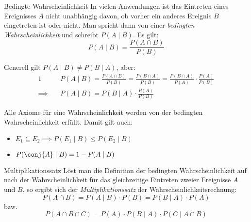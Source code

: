 \begin{defi}{Bedingte Wahrscheinlichkeit}
    In vielen Anwendungen ist das Eintreten eines Ereignisses $A$ nicht unabhängig davon, ob vorher ein anderes Ereignis $B$ eingetreten ist oder nicht.
    Man spricht dann von einer \emph{bedingten Wahrscheinlichkeit} und schreibt $P(A \mid B)$.
    Es gilt:
    \[
        P(A \mid B) = \frac{P(A \cap B)}{P(B)}
    \]

    Generell gilt $P(A \mid B) \neq P(B \mid A)$, aber:
    \begin{alignat*}{1}
                       & P(A \mid B) = \frac{P(A \cap B)}{P(B)} = \frac{P(B \cap A)}{P(B)} = \frac{P(B \cap A)}{P(A)} \cdot \frac{P(A)}{P(B)} \\
        \implies \quad & P(A \mid B) = P(B \mid A) \cdot \frac{P(A)}{P(B)}
    \end{alignat*}

    Alle Axiome für eine Wahrscheinlichkeit werden von der bedingten Wahrscheinlichkeit erfüllt.
    Damit gilt auch:
    \begin{itemize}
        \item $E_1 \subseteq E_2 \implies P(E_1 \mid B) \leq P(E_2 \mid B)$
        \item $P(\conj{A} \mid B) = 1 - P(A \mid B)$
    \end{itemize}
\end{defi}

\begin{defi}{Multiplikationssatz}
    Löst man die Definition der bedingten Wahrscheinlichkeit auf nach der Wahrscheinlichkeit für das gleichzeitige Eintreten zweier Ereignisse $A$ und $B$, so ergibt sich der \emph{Multiplikationssatz} der Wahrscheinlichkeitsrechnung:
    \[
        P(A \cap B) = P(A \mid B) \cdot P(B) = P(B \mid A) \cdot P(A)
    \]
    bzw.
    \[
        P(A \cap B \cap C) = P(A) \cdot P(B \mid A) \cdot P(C \mid A \cap B)
    \]
\end{defi}

